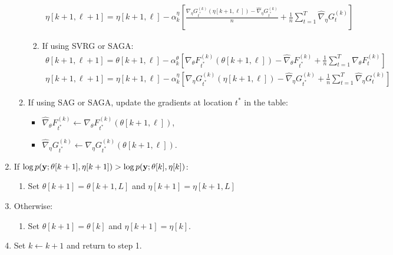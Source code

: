 \begin{enumerate}
\begin{enumerate}
\begin{enumerate}
\begin{gather}
                \eta[k+1,\ell+1] = \eta[k+1,\ell] - \alpha^{\eta}_k \left[\frac{\nabla_\eta G_{t^*}^{(k)}(\eta[k+1,\ell]) - \widehat \nabla_\eta G_{t^*}^{(k)}}{n} + \frac{1}{n} \sum_{t=1}^T \widehat \nabla_\eta G^{(k)}_{t} \right]
            \end{gather}
            \item If using SVRG or SAGA:
            \begin{gather}
                \theta[k+1,\ell+1] = \theta[k+1,\ell] - \alpha^{\theta}_k \left[\nabla_\theta F_{t^*}^{(k)}(\theta[k+1,\ell]) - \widehat \nabla_\theta F_{t^*}^{(k)} + \frac{1}{n} \sum_{t=1}^T \widehat \nabla_\theta F^{(k)}_{t} \right] \\
                \eta[k+1,\ell+1] = \eta[k+1,\ell] - \alpha^{\eta}_k \left[\nabla_\eta G_{t^*}^{(k)}(\eta[k+1,\ell]) - \widehat \nabla_\eta G_{t^*}^{(k)} + \frac{1}{n} \sum_{t=1}^T \widehat \nabla_\eta G^{(k)}_{t} \right]
            \end{gather}
        \end{enumerate}
        \item If using SAG or SAGA, update the gradients at location $t^*$ in the table:
        \begin{itemize}
            \item $\widehat \nabla_\theta F_{t^*}^{(k)} \leftarrow \nabla_\theta F_{t^*}^{(k)}(\theta[k+1,\ell])$,
            \item $\widehat \nabla_\eta G_{t^*}^{(k)} \leftarrow \nabla_\eta G_{t^*}^{(k)}(\theta[k+1,\ell])$.
        \end{itemize}
    \end{enumerate}
    \item If $\log p(\mathbf{y} ; \theta[k+1],\eta[k+1]) > \log p(\mathbf{y} ; \theta[k],\eta[k])$:
    \begin{enumerate}
        \item Set $\theta[k+1] = \theta[k+1,L]$ and $\eta[k+1] = \eta[k+1,L]$
    \end{enumerate}
    \item Otherwise:
    \begin{enumerate}
        \item Set $\theta[k+1] = \theta[k]$ and $\eta[k+1] = \eta[k]$.
    \end{enumerate} 
    \item Set $k \leftarrow k+1$ and return to step 1.
\end{enumerate}

